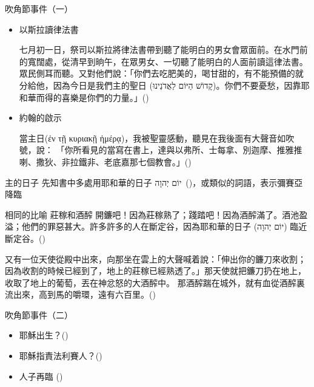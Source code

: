 \documentclass{beamer}
\newcommand{\parvspace}{\par\vspace{0.5em}}
\begin{document}
\begin{frame}{吹角節事件（一）}
    \begin{itemize}
        \item 以斯拉讀律法書\par
              \alert{七月初一日}，祭司以斯拉將律法書帶到聽了能明白的男女會眾面前。在水門前的寬闊處，從清早到晌午，在眾男女、一切聽了能明白的人面前讀這律法書。眾民側耳而聽。\textellipsis{}又對他們說：「你們去吃肥美的，喝甘甜的，有不能預備的就分給他，因為今日是\alert{我們主的聖日 (\texthebrew{קָדוֹשׁ הַיּוֹם לַאֲדֹנֵינוּ})}。你們不要憂愁，因靠耶和華而得的喜樂是你們的力量。」()
        \item 約翰的啟示\par
              \alert{當主日(\textgreek{ἐν τῇ κυριακῇ ἡμέρᾳ})}，我被聖靈感動，聽見在我後面\alert{有大聲音如吹號}，說： 「你所看見的當寫在書上，達與以弗所、士每拿、別迦摩、推雅推喇、撒狄、非拉鐵非、老底嘉那七個教會。」()
    \end{itemize}
\end{frame}

\begin{frame}{主的日子}
    先知書中多處用\alert{耶和華的日子 \texthebrew{יוֹם יְהוָה}}\ ()，或類似的詞語，表示\alert{彌賽亞降臨}\parvspace
\end{frame}

\begin{frame}{相同的比喻 \textemdash 莊稼和酒醡}
    \alert{開鐮}吧！因為\alert{莊稼熟了}；踐踏吧！因為\alert{酒醡滿了}。酒池盈溢；他們的\alert{罪惡甚大}。許多許多的人在斷定谷，因為耶和華的日子 (\texthebrew{יוֹם יְהוָה}) 臨近斷定谷。()\parvspace
    又有一位天使從殿中出來，向那坐在雲上的大聲喊着說：「\alert{伸出你的鐮刀來收割}；因為收割的時候已經到了，\alert{地上的莊稼已經熟透了}。」\textellipsis{}那天使就把鐮刀扔在地上，收取了地上的葡萄，丟在\alert{神忿怒的大酒醡中}。 那酒醡踹在城外，就有血從酒醡裏流出來，\alert{高到馬的嚼環，遠有六百里}。()\parvspace
\end{frame}

\begin{frame}{吹角節事件（二）}
    \begin{itemize}
        \item 耶穌出生？()
        \item 耶穌指責法利賽人？()\parencite{ChronologicalGospels}
        \item 人子再臨 ()
    \end{itemize}
\end{frame}
\end{document}
